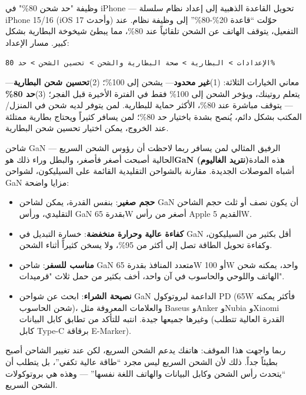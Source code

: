\begin{tcbinfo}{وظيفة "حد شحن 80\%" في iPhone — تحويل القاعدة الذهبية إلى إعداد نظام}
سلسلة iPhone 15/16 (iOS 17 وأحدث) حوّلت “قاعدة 20\%-80\%” إلى وظيفة نظام. عند التفعيل، يتوقف الهاتف عن الشحن تلقائياً عند 80\%، مما يبطئ شيخوخة البطارية بشكل كبير. مسار الإعداد:

\texttt{الإعدادات > البطارية > صحة البطارية والشحن > تحسين الشحن > حد 80\%}

معاني الخيارات الثلاثة: (1)\textbf{غير محدود}— يشحن إلى 100\%؛ (2)\textbf{تحسين شحن البطارية}— يتعلم روتينك، ويؤخر الشحن إلى 100\% فقط في الفترة الأخيرة قبل الفجر؛ (3)\textbf{حد 80\%}— يتوقف مباشرة عند 80\%، الأكثر حماية للبطارية. لمن يتوفر لديه شحن في المنزل/المكتب بشكل دائم، يُنصح بشدة باختيار حد 80\%؛ لمن يسافر كثيراً ويحتاج بطارية ممتلئة عند الخروج، يمكن اختيار تحسين شحن البطارية.

\end{tcbinfo}

\begin{tcbinfo}{شاحن GaN — الرفيق المثالي لمن يسافر}
ربما لاحظت أن رؤوس الشحن السريع الحالية أصبحت أصغر فأصغر، والبطل وراء ذلك هو\textbf{GaN (نتريد الغاليوم)}هذه المادة أشباه الموصلات الجديدة. مقارنة بالشواحن التقليدية القائمة على السيليكون، لشواحن GaN مزايا واضحة:

\begin{itemize}
  \item \textbf{حجم صغير}: بنفس القدرة، يمكن لشاحن GaN أن يكون نصف أو ثلث حجم الشاحن التقليدي، ورأس GaN بقدرة 65W أصغر من رأس Apple القديم 5W.
  \item \textbf{كفاءة عالية وحرارة منخفضة}: خسارة التبديل في GaN أقل بكثير من السيليكون، وكفاءة تحويل الطاقة تصل إلى أكثر من 95\%، ولا يسخن كثيراً أثناء الشحن.
  \item \textbf{مناسب للسفر}: شاحن GaN متعدد المنافذ بقدرة 65W أو 100W واحد، يمكنه شحن الهاتف واللوحي والحاسوب في آن واحد، أخف بكثير من حمل ثلاث "قرميدات".
  \item \textbf{نصيحة الشراء}: ابحث عن شواحن GaN الداعمة لبروتوكول PD (65W فأكثر يمكنه شحن الحاسوب)، والعلامات المعروفة مثل Baseus وAnker وNubia وXiaomi وغيرها جميعها جيدة. انتبه للتأكد من تطابق كابل البيانات (القدرة العالية تتطلب كابل Type-C برقاقة E-Marker).
\end{itemize}

\end{tcbinfo}


ربما واجهت هذا الموقف: هاتفك يدعم الشحن السريع، لكن عند تغيير الشاحن أصبح بطيئاً جداً. ذلك لأن الشحن السريع ليس مجرد “طاقة عالية تكفي”، بل يتطلب أن “يتحدث رأس الشحن وكابل البيانات والهاتف اللغة نفسها” — وهذه هي بروتوكولات الشحن السريع.

